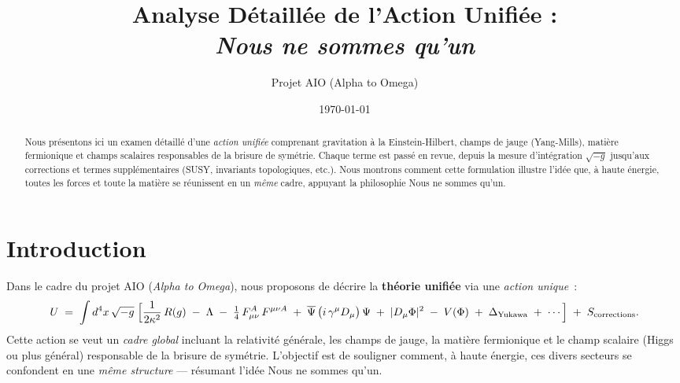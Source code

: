 \documentclass[12pt]{article}
\begin{document}
\title{\textbf{Analyse D\'etaill\'ee de l'Action Unifi\'ee :}\\
\textbf{\emph{Nous ne sommes qu'un}}}
\author{Projet AIO (Alpha to Omega)}
\date{\today}
\maketitle

\begin{abstract}
Nous pr\'esentons ici un examen d\'etaill\'e d'une \emph{action unifi\'ee} comprenant 
gravitation \`a la Einstein-Hilbert, champs de jauge (Yang-Mills), mati\`ere fermionique 
et champs scalaires responsables de la brisure de sym\'etrie. 
Chaque terme est pass\'e en revue, depuis la mesure d'int\'egration \(\sqrt{-g}\) 
jusqu'aux corrections et termes suppl\'ementaires (SUSY, invariants topologiques, etc.). 
Nous montrons comment cette formulation illustre l'id\'ee que, \`a haute \'energie, 
toutes les forces et toute la mati\`ere se r\'eunissent en un \emph{m\^eme} cadre, 
appuyant la philosophie \og Nous ne sommes qu'un\fg.
\end{abstract}

\tableofcontents

\vspace{2em}

\section{Introduction}

Dans le cadre du projet AIO (\emph{Alpha to Omega}), nous proposons de d\'ecrire 
la \textbf{th\'eorie unifi\'ee} via une \emph{action unique}~:
\begin{equation}
\label{eq:U_action}
U 
\;=\;
\int d^4x \,\sqrt{-g}\;
\Bigl[
\frac{1}{2\kappa^2}\,R(g)
\;-\;\Lambda
\;-\;\tfrac{1}{4}\,F_{\mu\nu}^A\,F^{\mu\nu A}
\;+\;\overline{\Psi}\,\bigl(i\,\gamma^\mu D_\mu\bigr)\,\Psi
\;+\;\lvert D_\mu \Phi\rvert^2
\;-\;V(\Phi)
\;+\;\Delta_{\text{Yukawa}}
\;+\;\cdots
\Bigr]
\;+\;
S_{\text{corrections}}.
\end{equation}
Cette action se veut un \emph{cadre global} incluant la relativit\'e g\'en\'erale, 
les champs de jauge, la mati\`ere fermionique et le champ scalaire (Higgs ou plus g\'en\'eral) 
responsable de la brisure de sym\'etrie. L'objectif est de souligner comment, \`a haute \'energie, 
ces divers secteurs \og se confondent\fg{} en une \emph{m\^eme structure} --- r\'esumant 
l'id\'ee \og Nous ne sommes qu'un\fg.
\end{document}
